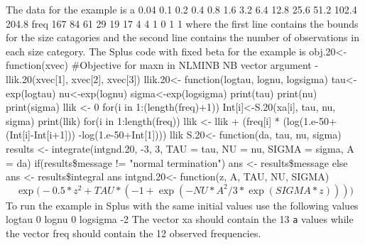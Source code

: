 \documentclass[12pt]{book}
\begin{document}
The data for the example is
\beginexample
a
 0.04 0.1 0.2 0.4 0.8 1.6 3.2 6.4 12.8 25.6 51.2 102.4 204.8
freq
 167 84 61 29 19 17 4 4 1 0 1 1
\endexample
\noindent where the first line contains the bounds for the size
catagories and the second line contains the number of observations
in each size category.
The Splus code with fixed beta for the example is
\beginexample
obj.20<-
function(xvec)
{
#Objective for maxn in NLMINB   NB vector argument
 - llik.20(xvec[1], xvec[2], xvec[3])
}
llik.20<-
function(logtau, lognu, logsigma)
{
        tau<-exp(logtau)
        nu<-exp(lognu)
        sigma<-exp(logsigma)
	print(tau)
	print(nu)
	print(sigma)
        llik <- 0
        for(i in 1:(length(freq)+1)) {
           Int[i]<-S.20(xa[i], tau, nu, sigma)
	}      
        print(llik)
        for(i in 1:length(freq)) {
           llik <- llik + (freq[i] * (log(1.e-50+(Int[i]-Int[i+1])) 
               -log(1.e-50+Int[1])))
        }
        llik
}
S.20<-
function(da, tau, nu, sigma)
{
        results <- integrate(intgnd.20, -3, 3, TAU = tau, NU = nu, SIGMA =
                sigma, A = da)
        if(results\$message != "normal termination")
                ans <- results\$message
        else ans <- results\$integral
        ans
}
intgnd.20<-
function(z, A, TAU, NU, SIGMA)
{
$$  \exp\big(-0.5 * z^2 + TAU * (-1 +\exp( - NU * A^2/3 * \exp(SIGMA * z)))\big)$$
}
\endexample
To run the example in Splus with the same initial values 
use the following values 
\beginexample
  logtau 0  lognu 0  logsigma -2
\endexample
The vector xa should contain the 13 {\tt a} values while
the vector freq should contain the 12 observed frequencies.

\endchapter
\htmlnewfile

\end{document}
